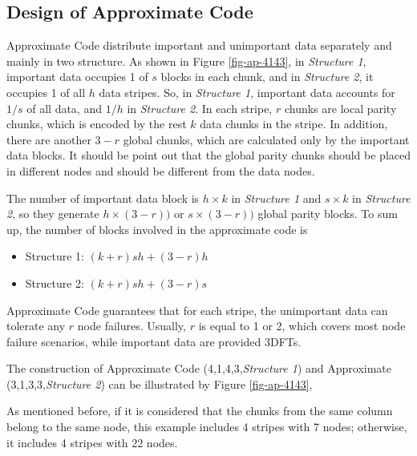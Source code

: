 \documentclass[sigconf]{acmart}
\begin{document}
\subsection{Design of Approximate Code}
Approximate Code distribute important and unimportant data separately and mainly in two structure. As shown in Figure \ref{fig-ap-4143}, in \emph{Structure 1}, important data occupies 1 of $s$ blocks in each chunk, and in \emph{Structure 2}, it occupies 1 of all $h$ data stripes.
So, in \emph{Structure 1}, important data accounts for $1/s$ of all data, and $1/h$ in \emph{Structure 2}.
In each stripe, $r$ chunks are local parity chunks, which is encoded by the rest $k$ data chunks in the stripe.
In addition, there are another $3-r$ global chunks, which are calculated only by the important data blocks. It should be point out that the global parity chunks should be placed in different nodes and should be different from the data nodes. 

The number of important data block is $h \times k$ in \emph{Structure 1} and $s \times k$ in \emph{Structure 2}, so they generate $h \times (3-r))$ or $s \times (3-r))$ global parity blocks.
To sum up, the number of blocks involved in the approximate code is 
\begin{itemize}
    \item Structure 1: $(k+r)sh + (3-r) h$
    \item Structure 2: $(k+r)sh + (3-r) s$
\end{itemize}

Approximate Code guarantees that for each stripe, the unimportant data can tolerate any $r$ node failures. Usually, $r$ is equal to 1 or 2, which covers most node failure scenarios, while important data are provided 3DFTs.

The construction of Approximate Code (4,1,4,3,\emph{Structure 1}) and Approximate (3,1,3,3,\emph{Structure 2}) can be illustrated by Figure \ref{fig-ap-4143},

As mentioned before, if it is considered that the chunks from the same column belong to the same node, this example includes 4 stripes with 7 nodes; otherwise, it includes 4 stripes with 22 nodes.
\end{document}
